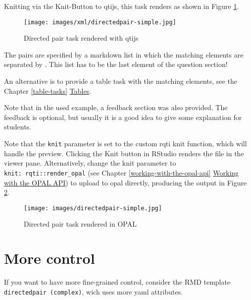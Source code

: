 \documentclass[twoside]{tufte-book}
\begin{document}
Knitting via the Knit-Button to qtijs, this task renders as shown in Figure \ref{dpqtijs1}.

\begin{figure}
\centering
\texttt{[image: images/xml/directedpair-simple.jpg]}
\caption{\label{dpqtijs1}Directed pair task rendered with qtijs}
\end{figure}

The pairs are specified by a markdown list in which the matching elements are separated by \texttt{\textbar{}}. This list has to be the last element of the question section!

An alternative is to provide a table task with the matching elements, see the Chapter \ref{table-tasks} \href{table.html}{Tables}.

Note that in the used example, a feedback section was also provided. The feedback is optional, but usually it is a good idea to give some explanation for students.

Note that the \texttt{knit} parameter is set to the custom rqti knit function,
which will handle the preview. Clicking the Knit button in RStudio renders the file in the viewer pane. \noindent \noindent Alternatively, change the knit parameter to \texttt{knit:\ rqti::render\_opal} (see Chapter \ref{working-with-the-opal-api} \href{api_opal.html}{Working with the OPAL API}) to upload to opal directly, producing the output in Figure \ref{dpopal1}.

\begin{figure}
\centering
\texttt{[image: images/directedpair-simple.jpg]}
\caption{\label{dpopal1}Directed pair task rendered in OPAL}
\end{figure}

\section{More control}\label{more-control-6}

If you want to have more fine-grained control, consider the RMD template \texttt{directedpair\ (complex)}, wich uses more yaml attributes.
\end{document}
